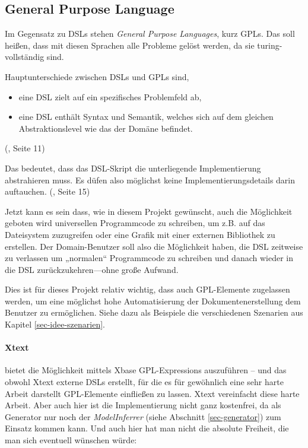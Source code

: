 \subsection{General Purpose Language}\label{sec-gpl}

Im Gegensatz zu DSLs stehen \emph{General Purpose Languages}, kurz GPLs.
Das soll heißen, dass mit diesen Sprachen alle Probleme gelöst werden, da
sie turing-vollständig sind.

Hauptunterschiede zwischen DSLs und GPLs sind,

\begin{itemize}
  \item eine DSL zielt auf ein spezifisches Problemfeld ab,
  \item eine DSL enthält Syntax und Semantik, welches sich auf dem gleichen
        Abstraktionslevel wie das der Domäne befindet.
\end{itemize}

(\cite{dsls}, Seite 11)

Das bedeutet, dass das DSL-Skript die unterliegende Implementierung abstrahieren
muss. Es düfen also möglichst keine Implementierungsdetails darin auftauchen.
(\cite{dsls}, Seite 15)

Jetzt kann es sein dass, wie in diesem Projekt gewünscht,
auch die Möglichkeit geboten wird universellen Programmcode zu schreiben,
um z.B. auf das Dateisystem zuzugreifen oder eine Grafik mit einer
externen Bibliothek zu erstellen. Der Domain-Benutzer soll also die
Möglichkeit haben, die DSL zeitweise zu verlassen um „normalen“ Programmcode
zu schreiben und danach wieder in die DSL zurückzukehren---ohne große
Aufwand.

Dies ist für dieses Projekt relativ wichtig, dass auch GPL-Elemente zugelassen
werden, um eine möglichst hohe Automatisierung der Dokumentenerstellung
dem Benutzer zu ermöglichen. Siehe dazu als Beispiele
die verschiedenen Szenarien aus Kapitel \ref{sec-idee-szenarien}.

\paragraph{Xtext} bietet die Möglichkeit mittels Xbase GPL-Expressions
auszuführen -- und das obwohl Xtext externe DSLs erstellt, für die es für
gewöhnlich eine sehr harte Arbeit darstellt GPL-Elemente einfließen zu lassen.
Xtext vereinfacht diese harte Arbeit. Aber auch hier ist die Implementierung
nicht ganz kostenfrei, da als Generator nur noch der \emph{ModelInferrer}
(siehe Abschnitt \ref{sec-generator}) zum Einsatz kommen kann.
Und auch hier hat man nicht die absolute Freiheit, die man sich eventuell
wünschen würde:

